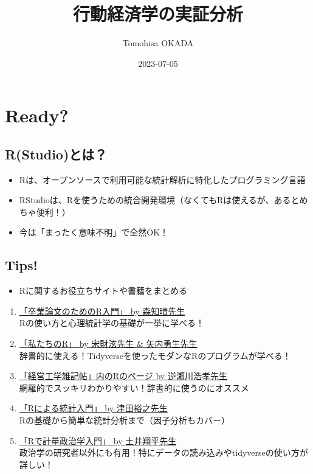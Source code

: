 \documentclass[
]{book}
\title{行動経済学の実証分析}
\author{Tomohisa OKADA}
\date{2023-07-05}
\providecommand{\tightlist}{%
  \setlength{\itemsep}{0pt}\setlength{\parskip}{0pt}}
\begin{document}
\maketitle

{
\setcounter{tocdepth}{1}
\tableofcontents
}
\hypertarget{ready}{%
\chapter{Ready?}\label{ready}}

\hypertarget{rstudioux3068ux306f}{%
\section{R(Studio)とは？}\label{rstudioux3068ux306f}}

\begin{itemize}
\tightlist
\item
  Rは、オープンソースで利用可能な統計解析に特化したプログラミング言語
\item
  RStudioは、Rを使うための統合開発環境（なくてもRは使えるが、あるとめちゃ便利！）\\
\item
  今は「まったく意味不明」で全然OK！
\end{itemize}

\hypertarget{tips}{%
\section{Tips!}\label{tips}}

\begin{itemize}
\tightlist
\item
  Rに関するお役立ちサイトや書籍をまとめる
\end{itemize}

\begin{enumerate}
\def\labelenumi{\arabic{enumi}.}
\item
  \href{https://tomoecon.github.io/R_for_graduate_thesis/}{「卒業論文のためのR入門」 by 森知晴先生}\\
  Rの使い方と心理統計学の基礎が一挙に学べる！
\item
  \href{https://www.jaysong.net/RBook/datahandling1.html}{「私たちのR」 by 宋財泫先生 \& 矢内勇生先生}\\
  辞書的に使える！Tidyverseを使ったモダンなRのプログラムが学べる！
\item
  \href{http://www.f.waseda.jp/sakas/R/index.html}{「経営工学雑記帖」内のRのページ by 逆瀬川浩孝先生}\\
  網羅的でスッキリわかりやすい！辞書的に使うのにオススメ
\item
  \href{https://htsuda.net/stats/}{「Rによる統計入門」 by 津田裕之先生}\\
  Rの基礎から簡単な統計分析まで（因子分析もカバー）
\item
  \href{https://shohei-doi.github.io/quant_polisci/index.html}{「Rで計量政治学入門」 by 土井翔平先生}\\
  政治学の研究者以外にも有用！特にデータの読み込みやtidyverseの使い方が詳しい！
\end{enumerate}
\end{document}
